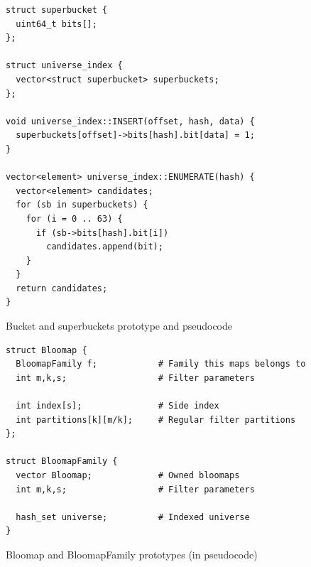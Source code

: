 \begin{figure}[!ht]
\begin{tcolorbox}
\begin{verbatim}
struct superbucket {
  uint64_t bits[];
};

struct universe_index {
  vector<struct superbucket> superbuckets;
};

void universe_index::INSERT(offset, hash, data) {
  superbuckets[offset]->bits[hash].bit[data] = 1;
}

vector<element> universe_index::ENUMERATE(hash) {
  vector<element> candidates;
  for (sb in superbuckets) {
    for (i = 0 .. 63) {
      if (sb->bits[hash].bit[i]) 
        candidates.append(bit);
    }
  }
  return candidates;
}
\end{verbatim}
\end{tcolorbox}
\caption{Bucket and superbuckets prototype and pseudocode}
	\label{figure-bucketshop-pseudocode}
\end{figure}

\begin{figure}[!ht]
\begin{tcolorbox}
\begin{verbatim}
struct Bloomap {
  BloomapFamily f;            # Family this maps belongs to
  int m,k,s;                  # Filter parameters

  int index[s];               # Side index
  int partitions[k][m/k];     # Regular filter partitions
};

struct BloomapFamily {
  vector Bloomap;             # Owned bloomaps
  int m,k,s;                  # Filter parameters

  hash_set universe;          # Indexed universe
}
\end{verbatim}
\end{tcolorbox}
	\caption{Bloomap and BloomapFamily prototypes (in pseudocode)}
\label{figure-bloomap-decl}
\end{figure}

